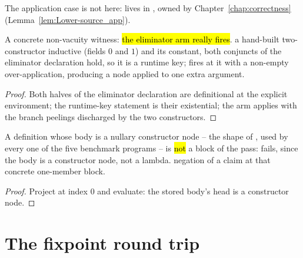 \begin{remark}
 The application case is not here:  lives in
, owned by Chapter~\ref{chap:correctness}
(Lemma~\ref{lem:Lower-source_app}).
\end{remark}

\begin{lemma}
\label{lem:LowerElimFixture-elimApp_fires}
\leanok
{}
 A concrete non-vacuity witness: \hl{the eliminator arm really fires}.
 a hand-built two-constructor inductive (fields $0$ and $1$) and its 
constant, both conjuncts of the eliminator declaration hold, so it is a runtime key; 
 fires at it with a non-empty over-application, producing a  node applied to
one extra argument.
\end{lemma}
\begin{proof}
\leanok
{}
 Both halves of the eliminator declaration are definitional at the explicit environment; the
runtime-key statement is their existential; the arm applies with the branch peelings discharged by the
two  constructors.
\end{proof}

\begin{lemma}
\label{lem:LowerCtorBodyFixture-lowerBlock_needs_lambda_bodies}
\leanok
{}
 A definition whose body is a nullary constructor node -- the shape of
, used by every one of the five benchmark programs -- is \hl{not} a block of the pass:
 fails, since the body is a constructor node, not a lambda.
 negation of a  claim at that concrete one-member block.
\end{lemma}
\begin{proof}
\leanok
{}
 Project  at index $0$ and evaluate: the stored body's head is a constructor node.
\end{proof}

\section{The fixpoint round trip}
\label{sec:lowering:fix}

